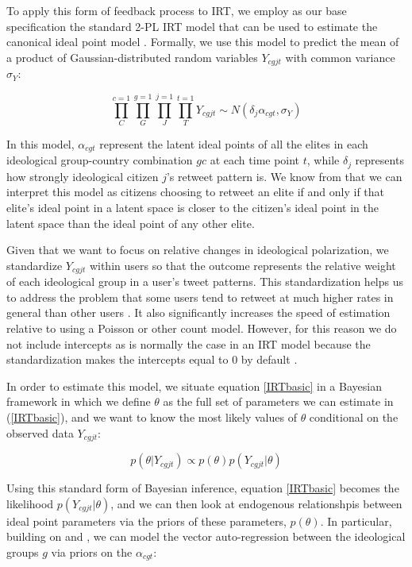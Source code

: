 \documentclass[12pt]{article}
\begin{document}
To apply this form of feedback process to IRT, we employ as our base specification the standard 2-PL IRT model that can be used to estimate the canonical ideal point model  \parencite{jackman2004}. Formally, we use this model to predict the mean of a product of Gaussian-distributed random variables $Y_{cgjt}$ with common variance $\sigma_Y$:

\begin{equation}\label{IRTbasic}
\prod^{c=1}_C \prod^{g=1}_G \prod^{j=1}_J \prod^{t=1}_T Y_{cgjt} \sim N( \delta_j  \alpha_{cgt},\sigma_{Y})
\end{equation}

In this model, $\alpha_{cgt}$ represent the latent ideal points of all the elites in each ideological group-country combination $gc$ at each time point $t$, while $\delta_j$ represents how strongly ideological citizen $j$'s retweet pattern is. We know from \textcite{jackman2004} that we can interpret this model as citizens choosing to retweet an elite if and only if that elite's ideal point in a latent space is closer to the citizen's ideal point in the latent space than the ideal point of any other elite. 

Given that we want to focus on relative changes in ideological polarization, we standardize $Y_{cgjt}$ within users so that the outcome represents the relative weight of each ideological group in a user's tweet patterns. This standardization helps us to address the problem that some users tend to retweet at much higher rates in general than other users \parencite{barbera2015}. It also significantly increases the speed of estimation relative to using a Poisson or other count model. However, for this reason we do not include intercepts as is normally the case in an IRT model because the standardization makes the intercepts equal to 0 by default \parencite{kropko2013}.

In order to estimate this model, we situate equation \ref{IRTbasic} in a Bayesian framework in which we define $\theta$ as the full set of parameters we can estimate in (\ref{IRTbasic}), and we want to know the most likely values of $\theta$ conditional on the observed data $Y_{cgjt}$:

\begin{equation}
	p(\theta|Y_{cgjt}) \propto p(\theta)p(Y_{cgjt}|\theta)
\end{equation}

Using this standard form of Bayesian inference, equation \ref{IRTbasic} becomes the likelihood $p(Y_{cgjt}|\theta)$, and we can then look at endogenous relationshpis between ideal point parameters via the priors of these parameters, $p(\theta)$. In particular, building on \textcite{quinn2002} and \textcite{kropko2013}, we can model the vector auto-regression between the ideological groups $g$ via priors on the $\alpha_{cgt}$:
\end{document}
